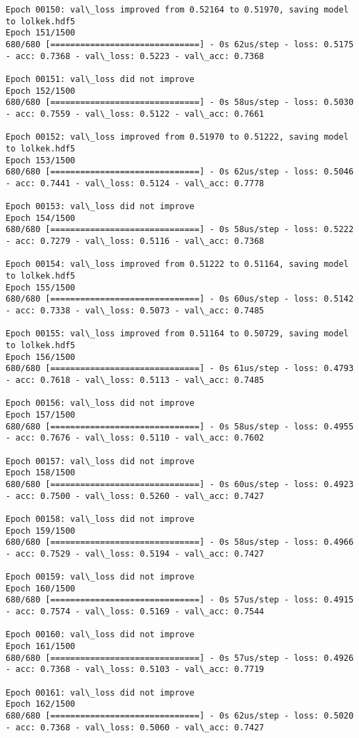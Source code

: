 \documentclass[11pt]{article}
\begin{document}
\begin{Verbatim}[commandchars=\\\{\}]
Epoch 00150: val\_loss improved from 0.52164 to 0.51970, saving model to lolkek.hdf5
Epoch 151/1500
680/680 [==============================] - 0s 62us/step - loss: 0.5175 - acc: 0.7368 - val\_loss: 0.5223 - val\_acc: 0.7368

Epoch 00151: val\_loss did not improve
Epoch 152/1500
680/680 [==============================] - 0s 58us/step - loss: 0.5030 - acc: 0.7559 - val\_loss: 0.5122 - val\_acc: 0.7661

Epoch 00152: val\_loss improved from 0.51970 to 0.51222, saving model to lolkek.hdf5
Epoch 153/1500
680/680 [==============================] - 0s 62us/step - loss: 0.5046 - acc: 0.7441 - val\_loss: 0.5124 - val\_acc: 0.7778

Epoch 00153: val\_loss did not improve
Epoch 154/1500
680/680 [==============================] - 0s 58us/step - loss: 0.5222 - acc: 0.7279 - val\_loss: 0.5116 - val\_acc: 0.7368

Epoch 00154: val\_loss improved from 0.51222 to 0.51164, saving model to lolkek.hdf5
Epoch 155/1500
680/680 [==============================] - 0s 60us/step - loss: 0.5142 - acc: 0.7338 - val\_loss: 0.5073 - val\_acc: 0.7485

Epoch 00155: val\_loss improved from 0.51164 to 0.50729, saving model to lolkek.hdf5
Epoch 156/1500
680/680 [==============================] - 0s 61us/step - loss: 0.4793 - acc: 0.7618 - val\_loss: 0.5113 - val\_acc: 0.7485

Epoch 00156: val\_loss did not improve
Epoch 157/1500
680/680 [==============================] - 0s 58us/step - loss: 0.4955 - acc: 0.7676 - val\_loss: 0.5110 - val\_acc: 0.7602

Epoch 00157: val\_loss did not improve
Epoch 158/1500
680/680 [==============================] - 0s 60us/step - loss: 0.4923 - acc: 0.7500 - val\_loss: 0.5260 - val\_acc: 0.7427

Epoch 00158: val\_loss did not improve
Epoch 159/1500
680/680 [==============================] - 0s 58us/step - loss: 0.4966 - acc: 0.7529 - val\_loss: 0.5194 - val\_acc: 0.7427

Epoch 00159: val\_loss did not improve
Epoch 160/1500
680/680 [==============================] - 0s 57us/step - loss: 0.4915 - acc: 0.7574 - val\_loss: 0.5169 - val\_acc: 0.7544

Epoch 00160: val\_loss did not improve
Epoch 161/1500
680/680 [==============================] - 0s 57us/step - loss: 0.4926 - acc: 0.7368 - val\_loss: 0.5103 - val\_acc: 0.7719

Epoch 00161: val\_loss did not improve
Epoch 162/1500
680/680 [==============================] - 0s 62us/step - loss: 0.5020 - acc: 0.7368 - val\_loss: 0.5060 - val\_acc: 0.7427


\end{Verbatim}
\end{document}
